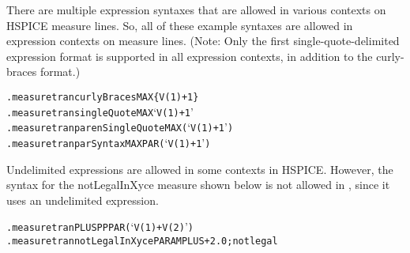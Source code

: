 There are multiple expression syntaxes that are allowed in various
contexts on HSPICE measure lines.  So, all of these example syntaxes
are allowed in expression contexts on \Xyce{} measure lines.  (Note:
Only the first single-quote-delimited expression format is supported
in all \Xyce{} expression contexts, in addition to the \Xyce{}
curly-braces format.)
\begin{alltt}
.measure tran curlyBraces MAX \{V(1)+1\}
.measure tran singleQuote MAX `V(1)+1'
.measure tran parenSingleQuote MAX (`V(1)+1')
.measure tran parSyntax MAX PAR(`V(1)+1')
\end{alltt}

Undelimited expressions are allowed in some contexts in HSPICE.
However, the syntax for the notLegalInXyce measure shown below
is not allowed in \Xyce{}, since it uses an undelimited expression.
\begin{alltt}
.measure tran PLUS PP PAR(`V(1)+V(2)')
.measure tran notLegalInXyce PARAM PLUS+2.0 ; not legal
\end{alltt}


